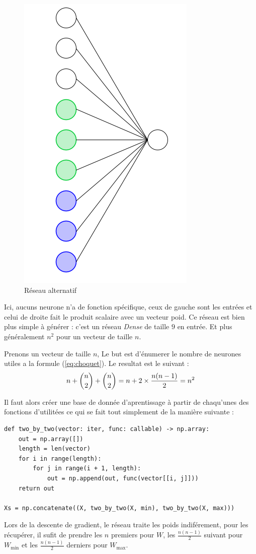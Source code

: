 \begin{figure}[H]
    \center
    \includegraphics[height=\petit]{pict/net3.png}
	\caption{Réseau alternatif}
	\label{fig:net3}
\end{figure}
\vspace{-12pt}
Ici, aucuns neurone n'a de fonction spécifique, ceux de gauche sont les entrées
et celui de droite fait le produit scalaire avec un vecteur poid.
Ce réseau est bien plus simple à générer : c'est un réseau \emph{Dense} de taille $9$ en entrée.
Et plus généralement $n^2$ pour un vecteur de taille $n$.


{
Prenons un vecteur de taille $n$,
Le but est d'énumerer le nombre de neurones utiles a la formule (\ref{eq:choquet}).
Le resultat est le suivant :
\begin{equation}
    n + \dbinom{n}{2} + \dbinom{n}{2} = n + 2 \times \frac{n(n-1)}{2} = n^2
\end{equation}
}

Il faut alors créer une base de donnée d'aprentissage à partir de chaqu'unes des fonctions d'utilitées
ce qui se fait tout simplement de la manière suivante :
\begin{lstlisting}[Language=Python]
def two_by_two(vector: iter, func: callable) -> np.array:
    out = np.array([])
    length = len(vector)
    for i in range(length):
        for j in range(i + 1, length):
            out = np.append(out, func(vector[[i, j]]))
    return out

Xs = np.concatenate((X, two_by_two(X, min), two_by_two(X, max)))
\end{lstlisting}
Lors de la descente de gradient, le réseau traite les poids indiférement, pour les récupérer,
il sufit de prendre les $n$ premiers pour $W$,
les $\frac{n(n-1)}{2}$ suivant pour $W_{\min}$
et les $\frac{n(n-1)}{2}$ derniers pour $W_{\max}$.
